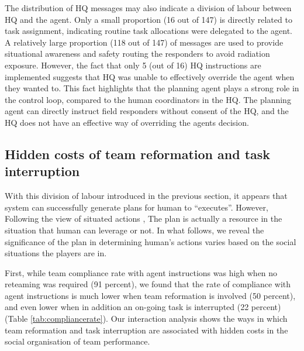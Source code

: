 The distribution of HQ messages may also indicate a division of labour between HQ and the agent. Only a small proportion (16 out of 147) is directly related to task assignment, indicating routine task allocations were delegated to the agent. A relatively large proportion (118 out of 147) of messages are used to provide situational awareness and safety routing the responders to avoid radiation exposure. However, the fact that only 5 (out of 16) HQ instructions are implemented suggests that HQ was unable to effectively override the agent when they wanted to. This fact highlights that the planning agent plays a strong role in the control loop, compared to the human coordinators in the HQ. The planning agent can directly instruct field responders without consent of the HQ, and the HQ does not have an effective way of overriding the agents decision. \\

\subsection{Hidden costs of team reformation and task interruption}\label{sec:study2social}
With this division of labour introduced in the previous section, it appears that system can successfully generate plans for human to ``executes''. However, Following the view of situated actions \cite{Suchman1987}, The plan is actually a resource in the situation that human can leverage or not. In what follows, we reveal the significance of the plan in determining human's actions varies based on the social situations the players are in. 

First, while team compliance rate with agent instructions was high when no reteaming was required (91 percent), we found that the rate of compliance with agent instructions is much lower when team reformation is involved (50 percent), and even lower when in addition an on-going task is interrupted (22 percent) (Table \ref{tab:compliancerate}). Our interaction analysis shows the ways in which team reformation and task interruption are associated with hidden costs in the social organisation of team performance.  \\

